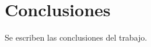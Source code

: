 \rhead{\newtitle}
\cfoot{\thepage}
\renewcommand{\headrulewidth}{1pt}
\renewcommand{\footrulewidth}{1pt}
\chapter{Conclusiones}
\noindent Se escriben las conclusiones del trabajo.